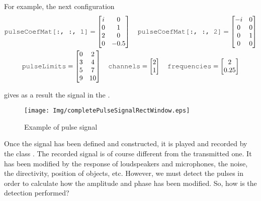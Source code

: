 For example, the next configuration
\begin{gather*}
\text{\variable{pulseCoefMat[:, :, 1]}} = 
\begin{bmatrix}
	i & 0 \\
	0 & 1 \\
	2 & 0 \\
	0 & -0.5 \\
\end{bmatrix}
\quad
\text{\variable{pulseCoefMat[:, :, 2]}} = 
\begin{bmatrix}
	-i & 0 \\
	0 & 0 \\
	0 & 1 \\
	0 & 0 \\
\end{bmatrix}\\
\text{\variable{pulseLimits}} =
\begin{bmatrix}
	0 & 2 \\
	3 & 4 \\
	5 & 7 \\
	9 & 10 \\
\end{bmatrix}
\quad
\text{\variable{channels}} =
\begin{bmatrix}
	2 \\
	1 \\
\end{bmatrix}
\quad
\text{\variable{frequencies}} =
\begin{bmatrix}
	2 \\
	0.25 \\
\end{bmatrix}
\end{gather*}

gives as a result the signal in the .

\begin{figure}[h]
	\centering
	\texttt{[image: Img/completePulseSignalRectWindow.eps]}
	\caption[Pulse Signal]{Example of pulse signal}
	\label{examplePulseSignal}
\end{figure}

Once the signal has been defined and constructed, it is played and recorded by the class . The recorded signal is of course different from the transmitted one. It has been modified by the response of loudspeakers and microphones, the noise, the directivity, position of objects, etc. However, we must detect the pulses in order to calculate how the amplitude and phase has been modified. So, how is the detection performed?

